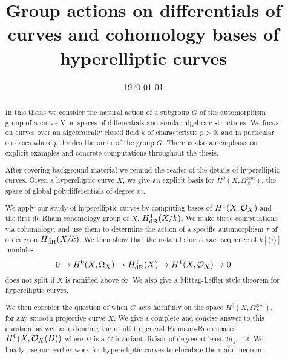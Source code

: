 \documentclass{ecsthesis}      %
\begin{document}
\frontmatter
\title      {Group actions on differentials of curves and cohomology bases of hyperelliptic curves}
\addresses  {\groupname\\\deptname\\\univname}
\date       {\today}
\subject    {}
\keywords   {}
\maketitle
\pagebreak
\pagebreak
\begin{abstract}
In this thesis we consider the natural action of a subgroup $G$ of the automorphism group of a curve $X$ on spaces of differentials and similar algebraic structures.
We focus on curves over an algebraically closed field $k$ of characteristic $p >0$, and in particular on cases where $p$ divides the order of the group $G$.
There is also an emphasis on explicit examples and concrete computations throughout the thesis.

After covering background material we remind the reader of the details of hyperelliptic curves.  %
Given a hyperelliptic curve $X$, we give an explicit basis for $H^0(X,\Omega_X^{\otimes m})$, the space of global polydifferentials of degree $m$.

We apply our study of hyperelliptic curves by computing bases of $H^1(X,\mathcal{O}_X)$ and the first de Rham cohomology group of $X$, $H_{\text {dR}}^1(X/k)$.
We make these computations via \cech cohomology, and use them to determine the action of a specific automorphism $\tau$ of order $p$ on $H_{\text {dR}}^1(X/k)$.
We then show that the natural short exact sequence of $k[\langle \tau \rangle]$-modules
    \[
    0 \rightarrow {H^0(X,\Omega_X)} \rightarrow H^1_{\text{dR}}(X) \rightarrow H^1(X,\mathcal{O}_X) \rightarrow 0
    \]
does not split if $X$ is ramified above $\infty$.
We also give a Mittag-Leffler style theorem for hyperelliptic curves.

We then consider the question of when $G$ acts faithfully on the space $H^0(X,\Omega_X^{\otimes m})$, for any smooth projective curve $X$.
We give a complete and concise answer to this question, as well as extending the result to general Riemann-Roch spaces $H^0(X,{\cal O}_X(D))$ where $D$ is a $G$-invariant divisor of degree at least $2g_X - 2$.
We finally use our earlier work for hyperelliptic curves to elucidate the main theorem.
\end{abstract}
\end{document}
